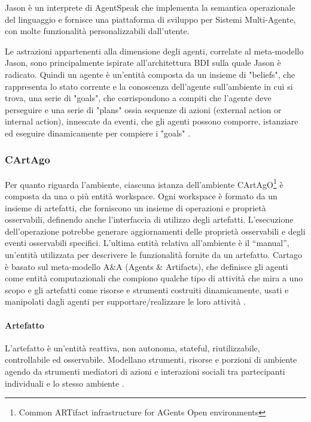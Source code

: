 Jason è un interprete di AgentSpeak che implementa la semantica operazionale del linguaggio e fornisce una piattaforma di sviluppo per Sistemi Multi-Agente, con molte funzionalità personalizzabili dall'utente.

\medskip

Le astrazioni appartenenti alla dimensione degli agenti, correlate al meta-modello Jason, sono principalmente ispirate all'architettura BDI sulla quale Jason è radicato. Quindi un agente è un'entità composta da un insieme di "beliefs", che rappresenta lo stato corrente e la conoscenza dell'agente sull'ambiente in cui si trova, una serie di "goals", che corrispondono a compiti che l'agente deve perseguire e una serie di "plans" ossia sequenze di azioni (external action or internal action), innescate da eventi, che gli agenti possono comporre, istanziare ed eseguire dinamicamente per compiere i "goals" \cite{jason-book}.

\subsubsection{CArtAgo}
Per quanto riguarda l'ambiente, ciascuna istanza dell'ambiente CArtAgO\footnote{Common ARTifact infrastructure for AGents Open environments} è composta da una o più entità workspace. Ogni workspace è formato da un insieme di artefatti, che forniscono un insieme di operazioni e proprietà osservabili, definendo anche l'interfaccia di utilizzo degli artefatti. L'esecuzione dell'operazione potrebbe generare aggiornamenti delle proprietà osservabili e degli eventi osservabili specifici. L'ultima entità relativa all'ambiente è il “manual”, un'entità utilizzata per descrivere le funzionalità fornite da un artefatto.
Cartago è basato sul meta-modello A\&A (Agents \& Artifacts), che definisce gli agenti come entità computazionali che compiono qualche tipo di attività che mira a uno scopo e gli artefatti come risorse e strumenti costruiti dinamicamente, usati e manipolati dagli agenti per supportare/realizzare le loro attività \cite{cartago}.

\smallskip

\paragraph{Artefatto}
L'artefatto è un'entità reattiva, non autonoma, stateful, riutilizzabile, controllabile ed osservabile. Modellano strumenti, risorse e porzioni di ambiente agendo da strumenti mediatori di azioni e interazioni sociali tra partecipanti individuali e lo stesso ambiente \cite{Omicini2008}.

